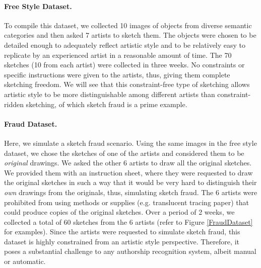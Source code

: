 

\vspace{-2mm}
\paragraph{Free Style Dataset.} To compile this dataset, we collected 10 images of objects from diverse semantic categories and then asked 7 artists to sketch them. The objects were chosen to be detailed enough to adequately reflect artistic style and to be relatively easy to replicate by an experienced artist in a reasonable amount of time. The 70 sketches (10 from each artist) were collected in three weeks. No constraints or specific instructions were given to the artists, thus, giving them complete sketching freedom. We will see that this constraint-free type of sketching allows artistic style to be more distinguishable among different artists than constraint-ridden sketching, of which sketch fraud is a prime example. %


\vspace{-2mm}
\paragraph{Fraud Dataset.}  Here, we simulate a sketch fraud scenario. Using the same images in the free style dataset, we chose the sketches of one of the artists and considered them to be \emph{original} drawings. We asked the other 6 artists to draw all the original sketches. We provided them with an instruction sheet, where they were requested to draw the original sketches in such a way that it would be very hard to distinguish their \emph{own} drawings from the originals, thus, simulating sketch fraud. The 6 artists were prohibited from using methods or supplies (e.g. translucent tracing paper) that could produce copies of the original sketches. Over a period of 2 weeks, we collected a total of 60 sketches from the 6 artists (refer to Figure \ref{FraudDataset} for examples). Since the artists were requested to simulate sketch fraud, this dataset is highly constrained from an artistic style perspective. Therefore, it poses a substantial challenge to any authorship recognition system, albeit manual or automatic.

